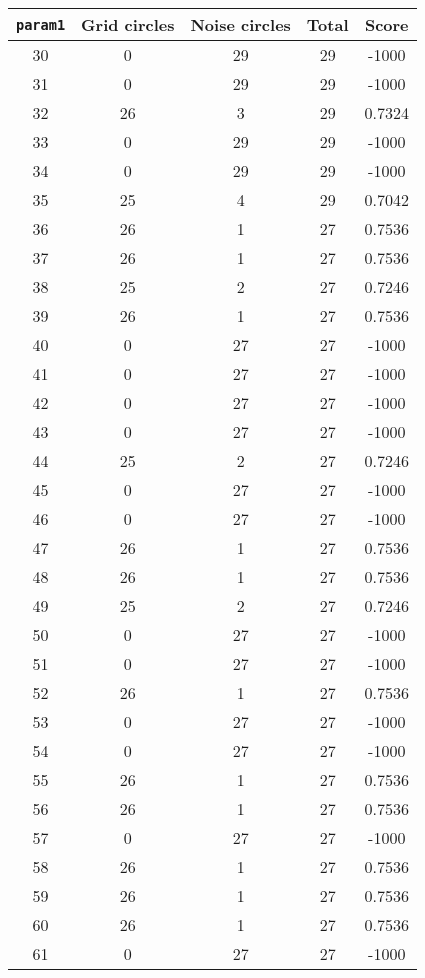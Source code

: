 \documentclass[letterpaper, 12pt]{article}
\begin{document}
\begin{longtable}{|c|c|c|c|c|}
\hline
\textbf{\texttt{param1}} & \textbf{Grid circles} & \textbf{Noise circles} & \textbf{Total} & \textbf{Score} \\
\hline
30 & 0 & 29 & 29 & -1000 \\
\hline
31 & 0 & 29 & 29 & -1000 \\
\hline
32 & 26 & 3 & 29 & 0.7324 \\
\hline
33 & 0 & 29 & 29 & -1000 \\
\hline
34 & 0 & 29 & 29 & -1000 \\
\hline
35 & 25 & 4 & 29 & 0.7042 \\
\hline
36 & 26 & 1 & 27 & 0.7536 \\
\hline
37 & 26 & 1 & 27 & 0.7536 \\
\hline
38 & 25 & 2 & 27 & 0.7246 \\
\hline
39 & 26 & 1 & 27 & 0.7536 \\
\hline
40 & 0 & 27 & 27 & -1000 \\
\hline
41 & 0 & 27 & 27 & -1000 \\
\hline
42 & 0 & 27 & 27 & -1000 \\
\hline
43 & 0 & 27 & 27 & -1000 \\
\hline
44 & 25 & 2 & 27 & 0.7246 \\
\hline
45 & 0 & 27 & 27 & -1000 \\
\hline
46 & 0 & 27 & 27 & -1000 \\
\hline
47 & 26 & 1 & 27 & 0.7536 \\
\hline
48 & 26 & 1 & 27 & 0.7536 \\
\hline
49 & 25 & 2 & 27 & 0.7246 \\
\hline
50 & 0 & 27 & 27 & -1000 \\
\hline
51 & 0 & 27 & 27 & -1000 \\
\hline
52 & 26 & 1 & 27 & 0.7536 \\
\hline
53 & 0 & 27 & 27 & -1000 \\
\hline
54 & 0 & 27 & 27 & -1000 \\
\hline
55 & 26 & 1 & 27 & 0.7536 \\
\hline
56 & 26 & 1 & 27 & 0.7536 \\
\hline
57 & 0 & 27 & 27 & -1000 \\
\hline
58 & 26 & 1 & 27 & 0.7536 \\
\hline
59 & 26 & 1 & 27 & 0.7536 \\
\hline
60 & 26 & 1 & 27 & 0.7536 \\
\hline
61 & 0 & 27 & 27 & -1000 \\

\end{longtable}
\end{document}
